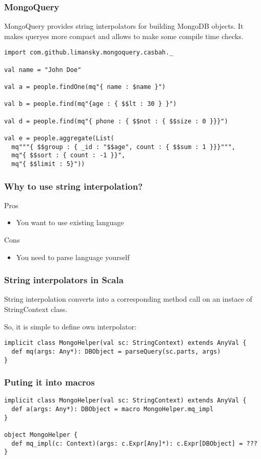 \begin{frame}[fragile]
\frametitle{MongoQuery}
MongoQuery provides string interpolators for building MongoDB objects.  It makes
queryes more compact and allows to make some compile time checks.

\begin{lstlisting}
import com.github.limansky.mongoquery.casbah._

val name = "John Doe"

val a = people.findOne(mq"{ name : $name }")

val b = people.find(mq"{age : { $$lt : 30 } }")

val d = people.find(mq"{ phone : { $$not : { $$size : 0 }}}")

val e = people.aggregate(List(
  mq"""{ $$group : { _id : "$$age", count : { $$sum : 1 }}}""",
  mq"{ $$sort : { count : -1 }}",
  mq"{ $$limit : 5}"))
\end{lstlisting}

\end{frame}

\begin{frame}
\frametitle{Why to use string interpolation?}
Pros
\begin{itemize}
\item You want to use existing language
\end{itemize}
Cons
\begin{itemize}
\item You need to parse language yourself
\end{itemize}
\end{frame}

\begin{frame}[fragile]
\frametitle{String interpolators in Scala}
String interpolation converts into a corresponding method call on an instace of
StringContext class.

So, it is simple to define own interpolator:
\begin{lstlisting}
implicit class MongoHelper(val sc: StringContext) extends AnyVal {
  def mq(args: Any*): DBObject = parseQuery(sc.parts, args)
}
\end{lstlisting}
\end{frame}

\begin{frame}[fragile]
\frametitle{Puting it into macros}
\begin{lstlisting}
implicit class MongoHelper(val sc: StringContext) extends AnyVal {
  def a(args: Any*): DBObject = macro MongoHelper.mq_impl
}

object MongoHelper {
  def mq_impl(c: Context)(args: c.Expr[Any]*): c.Expr[DBObject] = ???
}
\end{lstlisting}
\end{frame}




